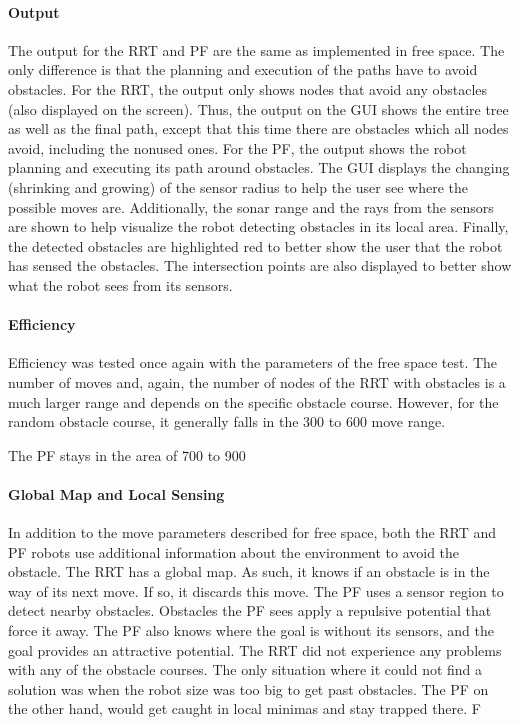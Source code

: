 \documentclass[12pt]{article}
\begin{document}
\paragraph*{Output}
The output for the RRT and PF are the same as implemented in free space. The only difference is that the planning and execution of the paths have to avoid obstacles. For the RRT, the output only shows nodes that avoid any obstacles (also displayed on the screen). Thus, the output on the GUI shows the entire tree as well as the final path, except that this time there are obstacles which all nodes avoid, including the nonused ones. For the PF, the output shows the robot planning and executing its path around obstacles. The GUI displays the changing (shrinking and growing) of the sensor radius to help the user see where the possible moves are. Additionally, the sonar range and the rays from the sensors are shown to help visualize the robot detecting obstacles in its local area. Finally, the detected obstacles are highlighted red to better show the user that the robot has sensed the obstacles. The intersection points are also displayed to better show what the robot sees from its sensors.

\paragraph*{Efficiency}
Efficiency was tested once again with the parameters of the free space test.
The number of moves and, again, the number of nodes of the RRT with obstacles is a much larger range and depends on the specific obstacle course. However, for the random obstacle course, it generally falls in the 300 to 600 move range.

The PF stays in the area of 700 to 900
\paragraph*{Global Map and Local Sensing}
In addition to the move parameters described for free space, both the RRT and PF robots use additional information about the environment to avoid the obstacle. The RRT has a global map. As such, it knows if an obstacle is in the way of its next move. If so, it discards this move. The PF uses a sensor region to detect nearby obstacles. Obstacles the PF sees apply a repulsive potential that force it away. The PF also knows where the goal is without its sensors, and the goal provides an attractive potential. The RRT did not experience any problems with any of the obstacle courses. The only situation where it could not find a solution was when the robot size was too big to get past obstacles. The PF on the other hand, would get caught in local minimas and stay trapped there. F
\end{document}

